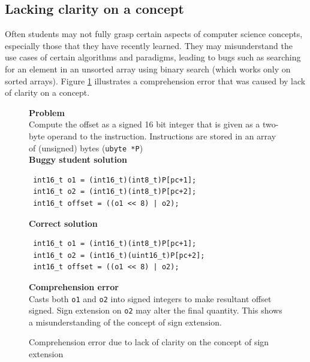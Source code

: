 \documentclass{sig-alternate}
\begin{document}
\subsection{Lacking clarity on a concept}
\label{sec:comp2}

Often students may not fully grasp certain aspects of computer science
concepts, especially those that they have recently learned. They may
misunderstand the use cases of certain algorithms and paradigms,
leading to bugs such as searching for an element in an unsorted array
using binary search (which works only on sorted arrays). Figure
\ref{fig:comp2} illustrates a comprehension error that was caused by
lack of clarity on a concept.


\begin{figure}
\begin{framed}
\setlength{\parindent}{0cm}
\textbf{Problem}\\

Compute the offset as a signed 16 bit integer that is given as a
two-byte operand to the instruction. Instructions are stored in an
array of (unsigned) bytes (\verb|ubyte *P|) \\

\textbf{Buggy student solution}
\vspace{-0.05in}
\begin{verbatim}
 int16_t o1 = (int16_t)(int8_t)P[pc+1];
 int16_t o2 = (int16_t)(int8_t)P[pc+2];
 int16_t offset = ((o1 << 8) | o2);
\end{verbatim}

\textbf{Correct solution}
\vspace{-0.05in}
\begin{verbatim}
 int16_t o1 = (int16_t)(int8_t)P[pc+1];
 int16_t o2 = (int16_t)(uint16_t)P[pc+2];
 int16_t offset = ((o1 << 8) | o2);
\end{verbatim}

\textbf{Comprehension error}\\

Casts both \verb|o1| and \verb|o2| into signed integers to make
resultant offset signed. Sign extension on \verb|o2| may alter the
final quantity. This shows a misunderstanding of the concept of sign
extension.

\end{framed}
\vspace{-0.1in}
\caption{Comprehension error due to lack of clarity on the concept of sign extension}
\label{fig:comp2}
\end{figure}
\end{document}
